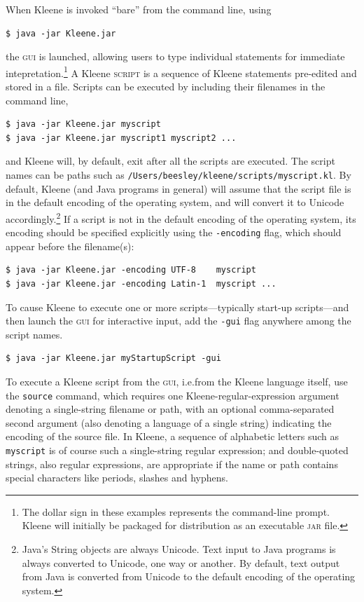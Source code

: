 \documentclass[letterpaper,12pt]{article}
\newcommand{\acro}{\textsc}
\begin{document}
When Kleene is invoked ``bare'' from the command line, using

\begin{Verbatim}[fontsize=\small]
$ java -jar Kleene.jar
\end{Verbatim}

\noindent
the \acro{gui} is launched, allowing users to type individual statements
for immediate intepretation.\footnote{The dollar sign in these examples
	represents the command-line prompt.  Kleene will initially be
	packaged for distribution as an executable \acro{jar} file.} A Kleene
	\acro{script} is a sequence of Kleene statements pre-edited and
	stored in a file.  Scripts can be executed by including their
	filenames in the command line,

\begin{Verbatim}[fontsize=\small]
$ java -jar Kleene.jar myscript
$ java -jar Kleene.jar myscript1 myscript2 ...
\end{Verbatim}

\noindent
and Kleene will, by default, exit after all the scripts are executed.
The script names can be paths such as
\texttt{/Users/beesley/kleene/scripts/myscript.kl}.  By default, Kleene
(and Java programs in general) will assume that the script file is in the
default encoding of the operating system, and will convert it to Unicode
accordingly.\footnote{Java's String objects are always Unicode.  Text
input to Java programs is always converted to Unicode, one way or
another.  By default, text output from Java is converted from Unicode to
the default encoding of the operating system.}  If a script is not in the
default encoding of the operating system, its encoding should be specified
explicitly using the \texttt{-encoding} flag, which should appear before
the filename(s):

\begin{Verbatim}[fontsize=\small]
$ java -jar Kleene.jar -encoding UTF-8    myscript
$ java -jar Kleene.jar -encoding Latin-1  myscript ...
\end{Verbatim}

\noindent
To cause Kleene to execute one or more scripts---typically start-up
scripts---and then launch the \acro{gui} for interactive input, add the
\texttt{-gui} flag anywhere among the script names.

\begin{Verbatim}[fontsize=\small]
$ java -jar Kleene.jar myStartupScript -gui
\end{Verbatim}

To execute a Kleene script from the \acro{gui}, i.e.\@ from the Kleene
language itself, use the \texttt{source} command, which requires one
Kleene-regular-expression argument denoting a single-string filename or path,
with an optional comma-separated second argument (also denoting a language of
a single string) indicating the encoding of the source file.  In Kleene, a
sequence of alphabetic letters such as \texttt{myscript} is of course such a
single-string regular expression; and double-quoted strings, also regular
expressions, are appropriate if the name or path contains special characters
like periods, slashes and hyphens.
\end{document}

